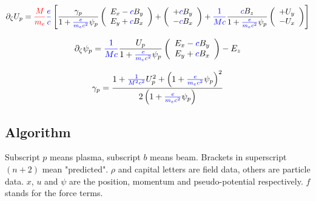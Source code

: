 \documentclass{article}
\begin{document}
\begin{equation}
\partial_{\zeta}U_p =
\textcolor{red}{\frac{M}{m_e}}
\textcolor{blue}{\frac{e}{c}}
\left[
\frac{\gamma_p}{1+\textcolor{blue}{\frac{e}{m_ec^2}}\psi_p}
\left(
\begin{array}{l}
   E_x - \textcolor{blue}{c}B_y \\
   E_y + \textcolor{blue}{c}B_x
\end{array}
\right)
+
\left(
\begin{array}{l}
   +\textcolor{blue}{c}B_y \\
   -\textcolor{blue}{c}B_x
\end{array}
\right)
+
\textcolor{blue}{\frac{1}{Mc}}
\frac{\textcolor{blue}{c}B_z}{1+\textcolor{blue}{\frac{e}{m_ec^2}}\psi_p}
\left(
\begin{array}{l}
   +U_y \\
   -U_x
\end{array}
\right)
\right]
\end{equation}

\begin{equation}
\partial_{\zeta}\psi_p =
\textcolor{blue}{\frac{1}{Mc}}
\frac{U_p}{1+\textcolor{blue}{\frac{e}{m_ec^2}}\psi_p}
\left(
\begin{array}{l}
   E_x - \textcolor{blue}{c}B_y \\
   E_y + \textcolor{blue}{c}B_x
\end{array}
\right)
-
E_z
\end{equation}

\begin{equation}
\gamma_p = \frac{1 + \textcolor{blue}{\frac{1}{M^2c^2}}U_p^2 + \left( 1+\textcolor{blue}{\frac{e}{m_ec^2}} \psi_p \right)^2}
                {2\left(1+\textcolor{blue}{\frac{e}{m_ec^2}}\psi_p\right)}
\end{equation}

\pagebreak

\subsection*{Algorithm}

Subscript $p$ means plasma, subscript $b$ means beam. Brackets in superscript $(n+2)$ mean "predicted". $\rho$ and capital letters are field data, others are particle data. $x$, $u$ and $\psi$ are the position, momentum and pseudo-potential respectively. $f$ stands for the force terms.
\end{document}
